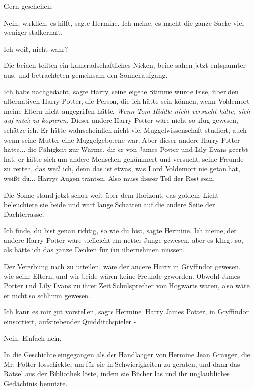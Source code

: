 \glqq{}Gern geschehen.\grqq{}

\glqq{}Nein, wirklich, es hilft\grqq{}, sagte Hermine. \glqq{}Ich meine, es macht
die ganze Sache viel weniger stalkerhaft.\grqq{}

\glqq{}Ich weiß, nicht wahr?\grqq{}

Die beiden teilten ein kameradschaftliches Nicken, beide sahen jetzt entspannter
aus, und betrachteten gemeinsam den Sonnenaufgang.

\glqq{}Ich habe nachgedacht\grqq{}, sagte Harry, seine eigene Stimme wurde leise,
\glqq{}über den alternativen Harry Potter, die Person, die ich hätte sein können,
wenn Voldemort meine Eltern nicht angegriffen hätte.\grqq{}
\emph{Wenn Tom Riddle nicht versucht hätte, sich auf mich zu kopieren.}
\glqq{}Dieser andere Harry Potter wäre nicht so klug gewesen, schätze ich. Er
hätte wahrscheinlich nicht viel Muggelwissenschaft studiert, auch wenn seine
Mutter eine Muggelgeborene war. Aber dieser andere Harry Potter hätte... die
Fähigkeit zur Wärme, die er von James Potter und Lily Evans geerbt hat, er hätte
sich um andere Menschen gekümmert und versucht, seine Freunde zu retten, das
weiß ich, denn das ist etwas, was Lord Voldemort nie getan hat, weißt du...\grqq{}
Harrys Augen tränten. \glqq{}Also muss dieser Teil der Rest sein.\grqq{}

Die Sonne stand jetzt schon weit über dem Horizont, das goldene Licht
beleuchtete sie beide und warf lange Schatten auf die andere Seite der
Dachterrasse.

\glqq{}Ich finde, du bist genau richtig, so wie du bist\grqq{}, sagte Hermine.
\glqq{}Ich meine, der andere Harry Potter wäre vielleicht ein netter Junge
gewesen, aber es klingt so, als hätte ich das ganze Denken für ihn übernehmen
müssen.\grqq{}

\glqq{}Der Vererbung nach zu urteilen, wäre der andere Harry in Gryffindor
gewesen, wie seine Eltern, und wir beide wären keine Freunde geworden. Obwohl
James Potter und Lily Evans zu ihrer Zeit Schulsprecher von Hogwarts waren, also
wäre er nicht so schlimm gewesen.\grqq{}

\glqq{}Ich kann es mir gut vorstellen\grqq{}, sagte Hermine. \glqq{}Harry James
Potter, in Gryffindor einsortiert, aufstrebender Quidditchspieler -\grqq{}

\glqq{}Nein. Einfach nein.\grqq{}

\glqq{}In die Geschichte eingegangen als der Handlanger von Hermine Jean Granger,
die Mr. Potter losschickte, um für sie in Schwierigkeiten zu geraten, und dann
das Rätsel aus der Bibliothek löste, indem sie Bücher las und ihr unglaubliches
Gedächtnis benutzte.\grqq{}

